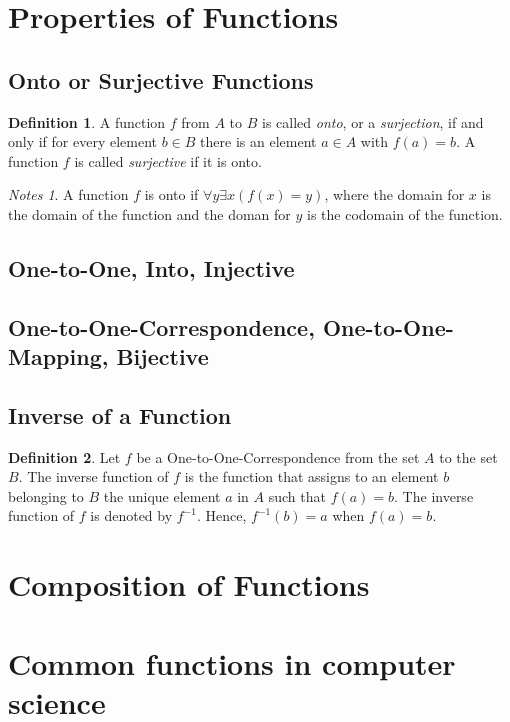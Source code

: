 \documentclass[11pt]{book} %
\theoremstyle {definition}
\newtheorem {definition}{Definition}[section]
\theoremstyle {remark}
\newtheorem*{notes}{Notes}
\begin{document}
\section {Properties of Functions}
    \subsection {Onto or Surjective Functions}
    \begin{definition}
    A function $f$ from $A$ to $B$ is called \textit{onto}, or a \textit{surjection}, if and only if for every element $b \in B$ there is an element $a \in A$ with $f(a)=b$. A function $f$ is called \textit{surjective} if it is onto.
    \end{definition}
    \begin{notes}
    A function $f$ is onto if $\forall y \exists x(f(x)=y)$, where the domain for $x$ is the domain of the function and the doman for $y$ is the codomain of the function.
    \end{notes}

    \subsection {One-to-One, Into, Injective}

    \subsection {One-to-One-Correspondence, One-to-One-Mapping, Bijective}

    \subsection {Inverse of a Function}
    \begin{definition}
    Let $f$ be a One-to-One-Correspondence from the set $A$ to the set $B$. The inverse function of
$f$ is the function that assigns to an element $b$ belonging to $B$ the unique element $a$ in $A$
such that $f (a) = b$. The inverse function of $f$ is denoted by $f^{-1}$. Hence, $f^{-1} (b) = a$ when
$f (a) = b$.
    \end{definition}


\section {Composition of Functions}

\section {Common functions in computer science}
\end{document}
